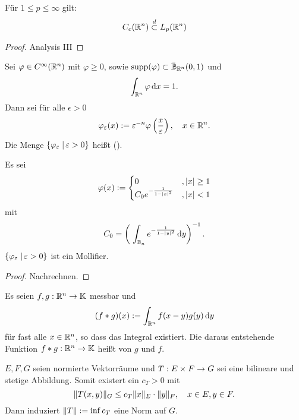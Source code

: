 \begin{lemma}
  \label{lemma:3.1}
  Für $1\leq p\leq\infty$ gilt:
  \[ C_c(\mathbb{R}^n)\overset{d}\subset L_p(\mathbb{R}^n) \]
\end{lemma}

\begin{proof}
  Analysis III
\end{proof}

\begin{defi}
  Sei $\varphi\in C^\infty(\mathbb{R}^n)$ mit $\varphi\geq0$, sowie $\operatorname{supp}(\varphi)\subset\bar{\mathbb{B}}_{\mathbb{R}^n}(0,1)$ und 
  \[\int_{\mathbb{R}^n}\varphi \,\mathrm{d} x=1.\]
  Dann sei für alle $\epsilon>0$
  \[ \varphi_\varepsilon(x):=\varepsilon^{-n}
  \varphi\left(\frac x{\varepsilon}\right), \quad x\in\mathbb{R}^n.\]
 Die Menge $\{\varphi_\varepsilon\;\vert\,\varepsilon>0\}$ heißt  ().  
\end{defi}

\begin{bem} Es sei
  \[
  \varphi(x):=
  \begin{cases}
    0&,\lvert x\rvert\geq 1 \\
    C_0e^{-\frac 1{1-\lvert x\rvert^2}}&,\lvert x\rvert<1
  \end{cases}
  \]
  mit
  \[
  C_0=\left(\;
    \int_{\mathbb{B}_n}e^{-\frac 1{1-\lvert y\rvert^2}}\,\mathrm{d} y
  \right)^{-1}.
  \]
  $\{\varphi_\varepsilon\;\vert\,\varepsilon>0\}$ ist ein Mollifier.
\end{bem}

\begin{proof}
  Nachrechnen.
\end{proof}

\begin{defi}
  Es seien $f,g:\mathbb{R}^n\rightarrow\mathbb{K}$ messbar und
  \[ ( f\ast g)(x) :=\int_{\mathbb{R}^n}f(x-y)g(y)\,\mathrm{d} y \]
  für fast alle $x\in\mathbb{R}^n$, so dass das Integral existiert. Die daraus entstehende Funktion $f\ast g:\mathbb{R}^n\rightarrow\mathbb{K}$ heißt  von $g$ und $f$.
\end{defi}

\begin{erinnerung}
  $E,F,G$ seien normierte Vektorräume und $T:E\times F\rightarrow G$ sei eine bilineare und stetige Abbildung. Somit existert ein $c_T>0$ mit
  \[
  \lVert T(x,y)\rVert_G\leq c_T\lVert x\rVert_E\cdot\lVert y\rVert_F,\quad x\in E,y\in F.
  \]
  Dann induziert $\lVert T\rVert:=\inf{c_T}$ eine Norm auf $G$. 
\end{erinnerung}

